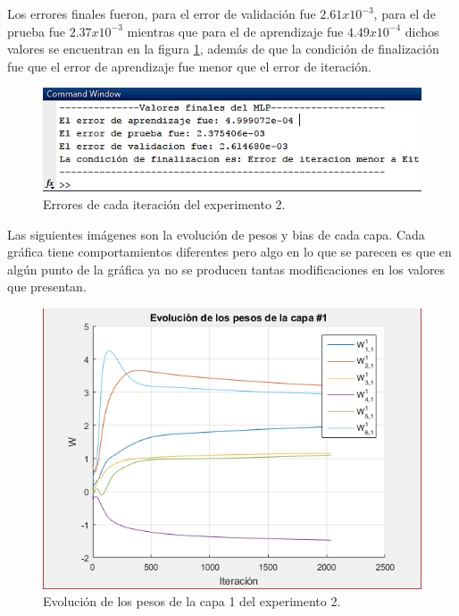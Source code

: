 Los errores finales fueron, para el error de validación fue $2.61 x 10^{-3}$, para el de prueba fue $2.37x10^{-3}$ mientras que para el de aprendizaje fue $4.49x10^{-4}$ dichos valores se encuentran en la figura \ref{fig:salida2}, además de que la condición de finalización fue que el error de aprendizaje fue menor que el error de iteración.
\begin{figure}[H]
    \begin{center}
        \includegraphics[width=14cm]{2/salida.png}
        \caption{Errores de cada iteración del experimento 2.}
        \label{fig:salida2}
    \end{center}
\end{figure}
Las siguientes imágenes son la evolución de pesos y bias de cada capa. Cada gráfica tiene comportamientos diferentes pero algo en lo que se parecen es que en algún punto de la gráfica ya no se producen tantas modificaciones en los valores que presentan.
\begin{figure}[H]
    \begin{center}
        \includegraphics[width=13cm]{2/pesos1.png}
        \caption{Evolución de los pesos de la capa 1 del experimento 2.}
        \label{fig:pesos3}
    \end{center}
\end{figure}

